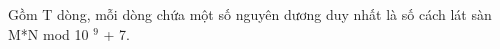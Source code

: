 Gồm T dòng, mỗi dòng chứa một số nguyên dương duy nhất là số cách lát sàn M*N mod 10   $^    9   $   + 7.